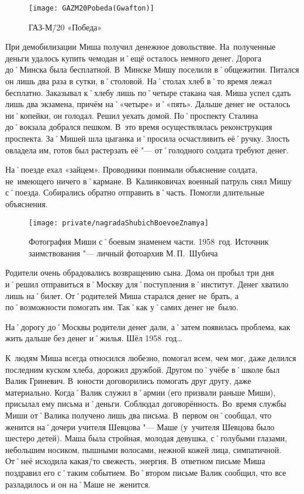 \begin{wrapfigure}{O}{.4\textwidth}
\centering
\texttt{[image: GAZM20Pobeda(Gwafton)]}
\caption[ГАЗ-М\=/20 «Победа»]{ГАЗ-М\=/20 «Победа»\footnotemark}
\label{fig:GAZM20Pobeda(Gwafton)}
\end{wrapfigure}

При демобилизации Миша получил денежное довольствие. На~полученные деньги удалось купить чемодан и˚ещё осталось немного денег. Дорога до˚Минска была бесплатной. В~Минске Мишу поселили в˚общежитии. Питался он лишь два раза в сутки, в˚столовой. На˚столах хлеб в˚то время лежал бесплатно. Заказывал к˚хлебу лишь по˚четыре стакана чая. Миша успел сдать лишь два экзамена, причём на˚«четыре» и˚«пять». Дальше денег не~осталось ни˚копейки, он голодал. Решил уехать домой. По˚проспекту Сталина до˚вокзала добрался пешком. В~это время осуществлялась реконструкция проспекта. За˚Мишей шла цыганка и˚просила осчастливить её˚ручку. Злость овладела им, готов был растерзать её "--- от˚голодного солдата требуют денег.

На˚поезде ехал «зайцем». Проводники понимали объяснение солдата, не~имеющего ничего в˚кармане. В~Калинковичах военный патруль снял Мишу с˚поезда. Собирались обратно отправить в˚часть. Помогли длительные объяснения.

\begin{figure}[h]
\texttt{[image: private/nagradaShubichBoevoeZnamya]}
\caption{Фотография Миши с˚боевым знаменем части. 1958~год. Источник заимствования "--- личный фотоархив М.\,П.~Шубича}
\label{fig:nagradaShubichBoevoeZnamya}
\end{figure}

Родители очень обрадовались возвращению сына. Дома он пробыл три дня и˚решил отправиться в˚Москву для˚поступления в˚институт. Денег хватило лишь на˚билет. От˚родителей Миша старался денег не~брать, а по˚возможности помогать им. Так˚как у˚самих денег не~было.

На˚дорогу до˚Москвы родители денег дали, а˚затем появилась проблема, как жить дальше без денег и˚жилья. Шёл 1958~год…

К~людям Миша всегда относился любезно, помогал всем, чем мог, даже делился последним куском хлеба, дорожил дружбой. Другом по˚учёбе в˚школе был Валик Гриневич. В~юности договорились помогать друг другу, даже материально. Когда˚Валик служил в˚армии (его призвали раньше Миши), присылал ему письма и˚деньги. Соблюдал договорённость. Во~время службы Миши от˚Валика получено лишь два письма. В~первом он˚сообщал, что женится на˚дочери учителя Шевцова "--- Маше (у~учителя Шевцова было шестеро детей). Маша была стройная, молодая девушка, с˚голубыми глазами, небольшим носиком, пышными волосами, нежной кожей лица, симпатичной. От˚неё исходила какая\=/то свежесть, энергия. В~ответном письме Миша поздравил его с˚таким событием. Во˚втором письме Валик сообщил, что все разладилось и он на˚Маше не~женится.

